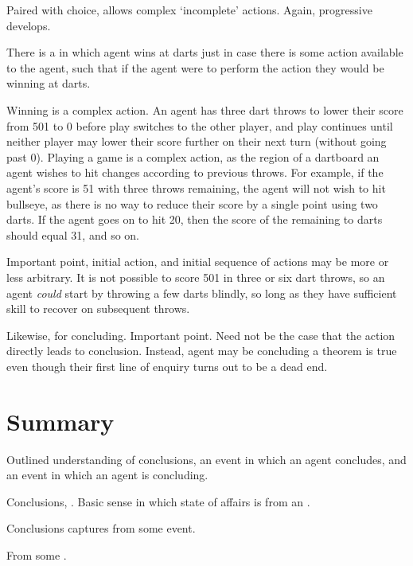 \begin{note}
  Paired with choice, allows complex `incomplete' actions.
  Again, progressive develops.

  \begin{illustration}[Darts]
    There is a \pevent{} in which agent wins at darts just in case there is some action available to the agent, such that if the agent were to perform the action they would be winning at darts.

    Winning is a complex action.
  An agent has three dart throws to lower their score from 501 to 0 before play switches to the other player, and play continues until neither player may lower their score further on their next turn (without going past 0).
  Playing a game is a complex action, as the region of a dartboard an agent wishes to hit changes according to previous throws.
  For example, if the agent's score is 51 with three throws remaining, the agent will not wish to hit bullseye, as there is no way to reduce their score by a single point using two darts.
  If the agent goes on to hit 20, then the score of the remaining to darts should equal 31, and so on.
  \end{illustration}

  Important point, initial action, and initial sequence of actions may be more or less arbitrary.
  It is not possible to score 501 in three or six dart throws, so an agent \emph{could} start by throwing a few darts blindly, so long as they have sufficient skill to recover on subsequent throws.
\end{note}

\begin{note}
  Likewise, for concluding.
  Important point.
  Need not be the case that the action directly leads to conclusion.
  Instead, agent may be concluding a theorem is true even though their first line of enquiry turns out to be a dead end.
\end{note}

\section{Summary}
\label{cha:clar:sec:sum}

\begin{note}
  Outlined understanding of conclusions, an event in which an agent concludes, and an event in which an agent is concluding.
\end{note}

\begin{note}
  Conclusions, .
  Basic sense in which state of affairs is from an \agpe{}.

  Conclusions captures \evalN{} from some event.

  From some \pool{}.
\end{note}


